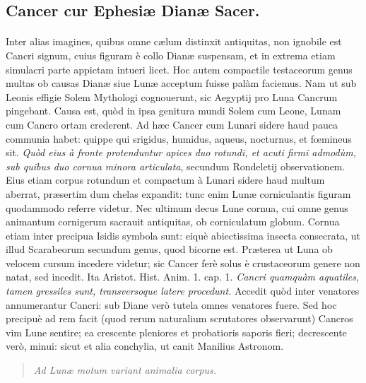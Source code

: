 \documentclass[a4paper, 11pt, oneside, polutonikogreek, latin]{article}
\begin{document}
\subsection{Cancer cur Ephesiæ Dianæ Sacer.}
\paragraph{}
Inter alias imagines, quibus omne cælum distinxit antiquitas, non ignobile est Cancri signum, cuius figuram è collo Dianæ suspensam, et in extrema etiam simulacri parte appictam intueri licet. Hoc autem compactile testaceorum genus multas ob causas Dianæ siue Lunæ acceptum fuisse palàm faciemus. Nam ut sub Leonis effigie Solem Mythologi cognouerunt, sic Aegyptij pro Luna Cancrum pingebant. Causa est, quòd in ipsa genitura mundi Solem cum Leone, Lunam cum Cancro ortam crederent. Ad hæc Cancer cum Lunari sidere haud pauca communia habet: quippe qui srigidus, humidus, aqueus, nocturnus, et fœmineus sit. \emph{Quòd eius à fronte protenduntur apices duo rotundi, et acuti firmi admodùm, sub quibus duo cornua minora articulata}, secundum Rondeletij observationem. Eius etiam corpus rotundum et compactum à Lunari sidere haud multum aberrat, præsertim dum chelas expandit: tunc enim Lunæ corniculantis figuram quodammodo referre videtur. Nec ultimum decus Lune cornua, cui omne genus animantum cornigerum sacrauit antiquitas, ob corniculatum globum. Cornua etiam inter precipua Isidis symbola sunt: eiquè abiectissima insecta consecrata, ut illud Scarabeorum secundum genus, quod bicorne est. Præterea ut Luna ob velocem cursum incedere videtur; sic Cancer ferè solus è crustaceorum genere non natat, sed incedit. Ita Aristot. Hist. Anim. 1. cap. 1. \emph{Cancri quamquàm aquatiles, tamen gressiles sunt, transversoque latere procedunt.} Accedit quòd inter venatores annumerantur Cancri: sub Diane verò tutela omnes venatores fuere. Sed hoc precipuè ad rem facit (quod rerum naturalium scrutatores observarunt) Cancros vim Lune sentire; ea crescente pleniores et probatioris saporis fieri; decrescente verò, minui: sicut et alia conchylia, ut canit Manilius Astronom.
\begin{quote}
\emph{Ad Lunæ motum variant animalia corpus.}
\end{quote}
\vspace*{-4mm}
\end{document}
